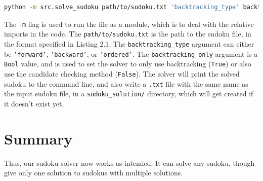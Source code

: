 \documentclass[12pt]{report} %
\begin{document}
\begin{lstlisting}[language=bash, caption={How to run the solver}]
  python -m src.solve_sudoku path/to/sudoku.txt 'backtracking_type' backtracking_only
\end{lstlisting}

The \texttt{-m} flag is used to run the file as a module, which is to deal with the relative imports in the code. The \texttt{path/to/sudoku.txt} is the path to the sudoku file, in the format specified in Listing 2.1. The \texttt{backtracking\_type} argument can either be \texttt{'forward'}, \texttt{'backward'}, or \texttt{'ordered'}. The \texttt{backtracking\_only} argument is a \texttt{Bool} value, and is used to set the solver to only use backtracking (\texttt{True}) or also use the candidate checking method (\texttt{False}). The solver will print the solved sudoku to the command line, and also write a \texttt{.txt} file with the same name as the input sudoku file, in a \texttt{sudoku\_solution/} directory, which will get created if it doesn't exist yet.



\chapter{Summary}

Thus, our sudoku solver now works as intended. It can solve any sudoku, though give only one solution to sudokus with multiple solutions. 



\end{document}
